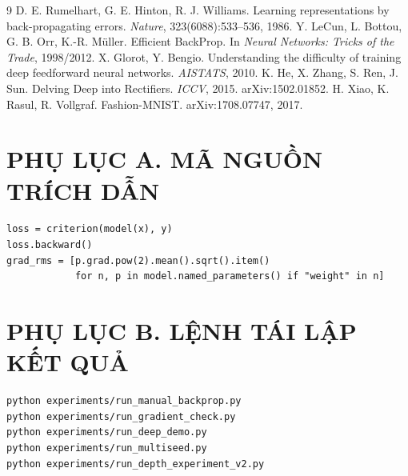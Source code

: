 \documentclass[12pt,a4paper]{report}
\begin{document}
\begin{thebibliography}{9}
 D. E. Rumelhart, G. E. Hinton, R. J. Williams. Learning representations by back-propagating errors. \emph{Nature}, 323(6088):533--536, 1986.
 Y. LeCun, L. Bottou, G. B. Orr, K.-R. Müller. Efficient BackProp. In \emph{Neural Networks: Tricks of the Trade}, 1998/2012.
 X. Glorot, Y. Bengio. Understanding the difficulty of training deep feedforward neural networks. \emph{AISTATS}, 2010.
 K. He, X. Zhang, S. Ren, J. Sun. Delving Deep into Rectifiers. \emph{ICCV}, 2015. arXiv:1502.01852.
 H. Xiao, K. Rasul, R. Vollgraf. Fashion-MNIST. arXiv:1708.07747, 2017.
\end{thebibliography}

\appendix
\chapter*{PHỤ LỤC A. MÃ NGUỒN TRÍCH DẪN}
\begin{lstlisting}[caption={Tính gradient RMS tại khởi tạo (trích, experiments/run\_deep\_demo.py)}]
loss = criterion(model(x), y)
loss.backward()
grad_rms = [p.grad.pow(2).mean().sqrt().item()
            for n, p in model.named_parameters() if "weight" in n]
\end{lstlisting}

\chapter*{PHỤ LỤC B. LỆNH TÁI LẬP KẾT QUẢ}
\begin{lstlisting}[language=bash]
python experiments/run_manual_backprop.py
python experiments/run_gradient_check.py
python experiments/run_deep_demo.py
python experiments/run_multiseed.py
python experiments/run_depth_experiment_v2.py
\end{lstlisting}
\end{document}
